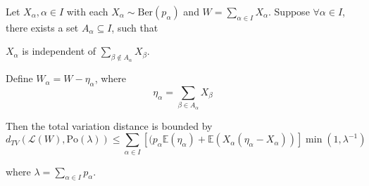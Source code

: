 \documentclass{article}
\begin{document}
\begin{theorem}\label{thm:poisson_stein_local}
    Let $X_\alpha, \alpha \in I$ with each $X_\alpha \sim \text{Ber}(p_\alpha)$ and $W = \sum_{\alpha \in I} X_\alpha$.  
    Suppose $\forall \alpha \in I$, there exists a set $A_\alpha \subseteq I$, such that
    \begin{center}
        $X_\alpha$ is independent of $\sum_{\beta \notin A_\alpha} X_\beta$. 
    \end{center}
    Define $W_\alpha = W - \eta_\alpha$, where
    \begin{equation*}
        \eta_\alpha = \sum_{\beta \in A_\alpha} X_\beta
    \end{equation*}  
    
    Then the total variation distance is bounded by
    \begin{equation}\label{eq:poisson_stein_local_bound}
        d_{TV}(\mathcal{L}(W), \text{Po}(\lambda)) \leq \sum_{\alpha\in I}[(p_{\alpha}\mathbb{E}(\eta_{\alpha})+\mathbb{E}(X_{\alpha}(\eta_{\alpha}-X_{\alpha}))]\operatorname*{min}\left(1,\lambda^{-1}\right)
    \end{equation}

    where $\lambda = \sum_{\alpha \in I} p_\alpha$.   
\end{theorem}
\end{document}

